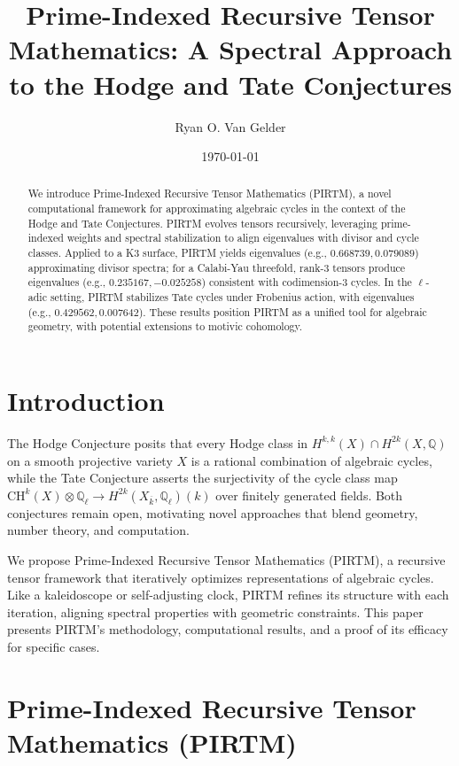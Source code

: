 \documentclass[11pt]{article}
\title{Prime-Indexed Recursive Tensor Mathematics: A Spectral Approach to the Hodge and Tate Conjectures}
\author{Ryan O. Van Gelder}
\date{\today}
\theoremstyle{plain}
\begin{document}
\maketitle

\begin{abstract}
We introduce Prime-Indexed Recursive Tensor Mathematics (PIRTM), a novel computational framework for approximating algebraic cycles in the context of the Hodge and Tate Conjectures. PIRTM evolves tensors recursively, leveraging prime-indexed weights and spectral stabilization to align eigenvalues with divisor and cycle classes. Applied to a K3 surface, PIRTM yields eigenvalues (e.g., $0.668739, 0.079089$) approximating divisor spectra; for a Calabi-Yau threefold, rank-3 tensors produce eigenvalues (e.g., $0.235167, -0.025258$) consistent with codimension-3 cycles. In the \(\ell\)-adic setting, PIRTM stabilizes Tate cycles under Frobenius action, with eigenvalues (e.g., $0.429562, 0.007642$). These results position PIRTM as a unified tool for algebraic geometry, with potential extensions to motivic cohomology.
\end{abstract}

\section{Introduction}
The Hodge Conjecture posits that every Hodge class in \(H^{k,k}(X) \cap H^{2k}(X, \mathbb{Q})\) on a smooth projective variety \(X\) is a rational combination of algebraic cycles, while the Tate Conjecture asserts the surjectivity of the cycle class map \(\text{CH}^k(X) \otimes \mathbb{Q}_\ell \to H^{2k}(X_{\overline{k}}, \mathbb{Q}_\ell)(k)\) over finitely generated fields. Both conjectures remain open, motivating novel approaches that blend geometry, number theory, and computation.

We propose Prime-Indexed Recursive Tensor Mathematics (PIRTM), a recursive tensor framework that iteratively optimizes representations of algebraic cycles. Like a kaleidoscope or self-adjusting clock, PIRTM refines its structure with each iteration, aligning spectral properties with geometric constraints. This paper presents PIRTM’s methodology, computational results, and a proof of its efficacy for specific cases.

\section{Prime-Indexed Recursive Tensor Mathematics (PIRTM)}
\end{document}

